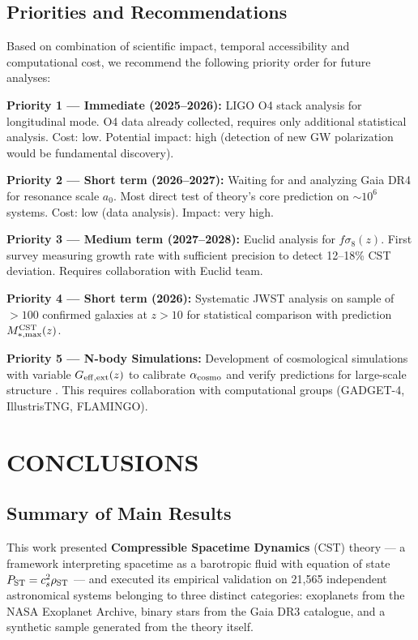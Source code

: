 \documentclass[10pt,a4paper]{article}
\begin{document}
\subsection{Priorities and
Recommendations}\label{priorities-and-recommendations}

Based on combination of scientific impact, temporal accessibility and
computational cost, we recommend the following priority order for future
analyses:

\textbf{Priority 1 --- Immediate (2025--2026):} LIGO O4 stack analysis
for longitudinal mode. O4 data already collected, requires only
additional statistical analysis. Cost: low. Potential impact: high
(detection of new GW polarization would be fundamental discovery).

\textbf{Priority 2 --- Short term (2026--2027):} Waiting for and
analyzing Gaia DR4 for resonance scale \(a_0\). Most direct test of
theory's core prediction on \(\sim 10^6\) systems. Cost: low (data
analysis). Impact: very high.

\textbf{Priority 3 --- Medium term (2027--2028):} Euclid analysis for
\(f\sigma_8(z)\). First survey measuring growth rate with sufficient
precision to detect 12--18\% CST deviation. Requires collaboration with
Euclid team.

\textbf{Priority 4 --- Short term (2026):} Systematic JWST analysis on
sample of \(> 100\) confirmed galaxies at \(z > 10\) for statistical
comparison with prediction \(M_{*,\rm max}^{\rm CST}(z)\).

\textbf{Priority 5 --- N-body Simulations:} Development of cosmological
simulations with variable \(G_{\rm eff,ext}(z)\) to calibrate
\(\alpha_{\rm cosmo}\) and verify predictions for large-scale structure \cite{Weinberg2008}.
This requires collaboration with computational groups (GADGET-4,
IllustrisTNG, FLAMINGO).

\section{CONCLUSIONS}\label{conclusions}

\subsection{Summary of Main
Results}\label{summary-of-main-results}

This work presented \textbf{Compressible Spacetime Dynamics} (CST)
theory --- a framework interpreting spacetime as a barotropic fluid with
equation of state \(P_{\rm ST} = c_s^2 \rho_{\rm ST}\) --- and executed
its empirical validation on 21,565 independent astronomical systems
belonging to three distinct categories: exoplanets from the NASA
Exoplanet Archive, binary stars from the Gaia DR3 catalogue, and a
synthetic sample generated from the theory itself.
\end{document}
